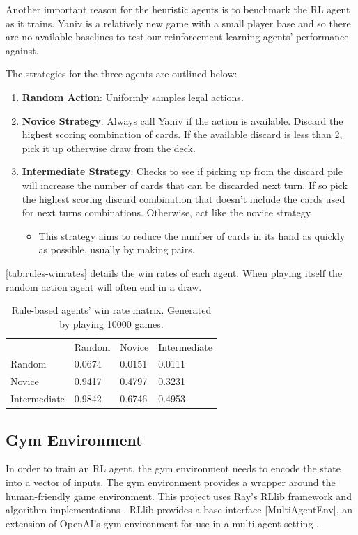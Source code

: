 \documentclass[../main.tex]{subfiles}
\begin{document}
Another important reason for the heuristic agents is to benchmark the RL agent as it trains. Yaniv is a relatively new game with a small player base and so there are no available baselines to test our reinforcement learning agents' performance against.

The strategies for the three agents are outlined below:
\begin{enumerate}
    \item \textbf{Random Action}: Uniformly samples legal actions.
    \item \textbf{Novice Strategy}: Always call Yaniv if the action is available. Discard the highest scoring combination of cards. If the available discard is less than 2, pick it up otherwise draw from the deck. 
    \item \textbf{Intermediate Strategy}: Checks to see if picking up from the discard pile will increase the number of cards that can be discarded next turn. If so pick the highest scoring discard combination that doesn't include the cards used for next turns combinations. Otherwise, act like the novice strategy. 
    \begin{itemize}
        \item This strategy aims to reduce the number of cards in its hand as quickly as possible, usually by making pairs. 
    \end{itemize}
\end{enumerate}

\autoref{tab:rules-winrates} details the win rates of each agent. When playing itself the random action agent will often end in a draw. 

\begin{table}[]
\centering
\begin{tabular}{@{}llll@{}}
             & Random & Novice & Intermediate \\
Random       & 0.0674 & 0.0151 & 0.0111       \\
Novice       & 0.9417 & 0.4797 & 0.3231       \\
Intermediate & 0.9842 & 0.6746 & 0.4953      
\end{tabular}
\caption{Rule-based agents' win rate matrix. Generated by playing 10000 games.}
\label{tab:rules-winrates}
\end{table}

\subsection{Gym Environment}
In order to train an RL agent, the gym environment needs to encode the state into a vector of inputs. The gym environment provides a wrapper around the human-friendly game environment. This project uses Ray's RLlib framework and algorithm implementations \cite{liang_rllib_2018}. RLlib provides a base interface |MultiAgentEnv|, an extension of OpenAI's gym environment for use in a multi-agent setting \cite{brockman_openai_2016,seita_scaling_nodate}. 
\end{document}
